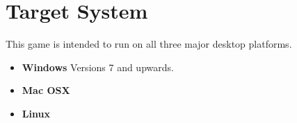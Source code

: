 \section{Target System}

This game is intended to run on all three major desktop platforms.
\begin{itemize}
    \item
        \textbf{Windows} Versions 7 and upwards.
    \item
        \textbf{Mac OSX}
    \item
        \textbf{Linux}
\end{itemize}

